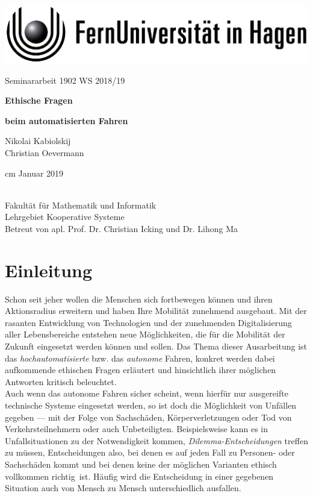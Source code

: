 \documentclass[twoside,a4paper,12pt]{article}
\begin{document}
\thispagestyle{empty}
\begin{center}
	\includegraphics[scale=1]{resources/fernunisignet-sw}
\end{center}
\vskip 4cm
\begin{center}
	{\Large Seminararbeit 1902 WS 2018/19\par}
	\vskip 2.5cm
	{\textbf{\Large Ethische Fragen} \par}    
	\vskip 0.2cm	
	{\textbf{\Large beim automatisierten Fahren} \par}    
	\vskip 1cm
	{\Large Nikolai Kabiolskij\\Christian Oevermann \par}
	 cm
	\Large Januar 2019
\end{center}
\FUiH\\
Fakultät für Mathematik und Informatik\\
Lehrgebiet Kooperative Systeme\\
Betreut von apl. Prof. Dr. Christian Icking und Dr. Lihong Ma\\
  
\newpage
\shipout\hbox{}
\newpage

\frontmatter

\section{Einleitung} \label{Einleitung}
Schon seit jeher wollen die Menschen sich fortbewegen können und ihren Aktionsradius erweitern und haben Ihre Mobilität zunehmend ausgebaut. Mit der rasanten
Entwicklung von Technologien und der zunehmenden Digitalisierung aller Lebensbereiche entstehen neue Möglichkeiten, die für die Mobilität der Zukunft eingesetzt 
werden können und sollen. Das Thema dieser Ausarbeitung ist das \textit{hochautomatisierte} bzw. das \textit{autonome} Fahren, konkret werden dabei aufkommende
ethischen Fragen erläutert und hinsichtlich ihrer möglichen Antworten kritisch beleuchtet. \\ 

Auch wenn das autonome Fahren sicher scheint, wenn hierfür nur ausgereifte technische Systeme eingesetzt werden, so ist doch die Möglichkeit von Unfällen gegeben ---
mit der Folge von Sachschäden, Körperverletzungen oder Tod von Verkehrsteilnehmern oder auch Unbeteiligten. Beispielsweise kann es in Unfallsituationen zu der
Notwendigkeit kommen, \textit{Dilemma-Entscheidungen} treffen zu müssen, Entscheidungen also, bei denen es auf jeden Fall zu Personen- oder Sachschäden kommt
und bei denen keine der möglichen Varianten ethisch vollkommen \glqq richtig\grqq\ ist. Häufig wird die Entscheidung in einer gegebenen Situation auch von Mensch zu
Mensch unterschiedlich ausfallen. \\ 
\end{document}
